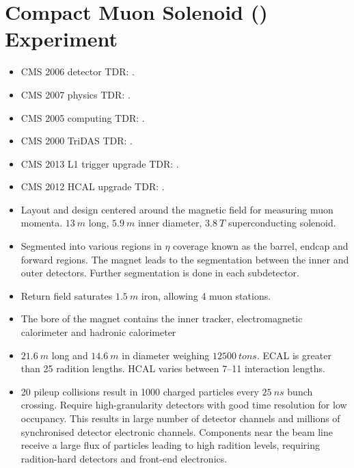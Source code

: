 \section{Compact Muon Solenoid (\CMS) Experiment}

    \begin{itemize}
        \item CMS 2006 detector TDR: \cite{Bayatian:922757}.
        \item CMS 2007 physics TDR: \cite{Bayatian:942733}.
        \item CMS 2005 computing TDR: \cite{Bayatyan:838359}.
        \item CMS 2000 TriDAS TDR: \cite{Bayatyan:706847}.
        \item CMS 2013 L1 trigger upgrade TDR: \cite{Tapper:1556311}.
        \item CMS 2012 HCAL upgrade TDR: \cite{Mans:1481837}.
        \item Layout and design centered around the magnetic field for measuring
            muon momenta. ${\SI{13}{m}}$ long, ${\SI{5.9}{m}}$ inner diameter,
            ${\SI{3.8}{T}}$ superconducting solenoid.
        \item Segmented into various regions in $\eta$ coverage known as the barrel,
            endcap and forward regions. The magnet leads to the segmentation between
            the inner and outer detectors. Further segmentation is done in each
            subdetector.
        \item Return field saturates ${\SI{1.5}{m}}$ iron, allowing 4 muon stations.
        \item The bore of the magnet contains the inner tracker, electromagnetic
            calorimeter and hadronic calorimeter
        \item ${\SI{21.6}{m}}$ long and ${\SI{14.6}{m}}$ in diameter weighing
            ${\SI{12500}{tons}}$. ECAL is greater than 25 radition lengths. HCAL
            varies between 7--11 interaction lengths.
        \item 20 pileup collisions result in 1000 charged particles every
            ${\SI{25}{ns}}$ bunch crossing. Require high-granularity detectors
            with good time resolution for low occupancy. This results in large
            number of detector channels and millions of synchronised detector
            electronic channels. Components near the beam line receive a large
            flux of particles leading to high radition levels, requiring
            radition-hard detectors and front-end electronics.
    \end{itemize}

